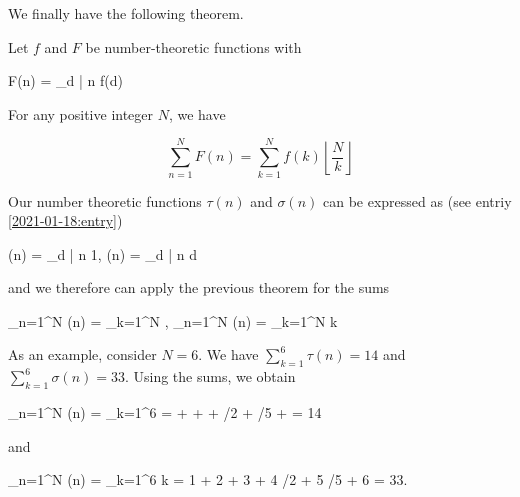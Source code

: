 We finally have the following theorem.

\begin{theorem}
    Let $f$ and $F$ be number-theoretic functions with

    \bee
        F(n) = \sum_{d | n} f(d)
    \eee

    For any positive integer $N$, we have

    \begin{equation}
        \sum_{n=1}^N F(n) = \sum_{k=1}^N f(k) \left\lfloor \frac{N}{k} \right\rfloor
    \end{equation}

\end{theorem}

Our number theoretic functions $\tau(n)$ and $\sigma(n)$ can be expressed as (see entriy \ref{2021-01-18:entry})

\bee
\tau(n) = \sum_{d | n} 1, \qquad \sigma(n) = \sum_{d | n} d
\eee

and we therefore can apply the previous theorem for the sums

\bee
\sum_{n=1}^N \tau(n) = \sum_{k=1}^N \left\lfloor {} \right\rfloor, \qquad \sum_{n=1}^N \sigma(n) = \sum_{k=1}^N k \left\lfloor {} \right\rfloor
\eee

As an example, consider $N = 6$. We have $\sum_{k=1}^6 \tau(n) = 14$ and $\sum_{k=1}^6 \sigma(n) = 33$. Using the sums, we obtain

\bee
\sum_{n=1}^N \tau(n) = \sum_{k=1}^6 \left\lfloor {} \right\rfloor =  \rfloor +  \rfloor +  \rfloor + /2 \rfloor + /5 \rfloor +  \rfloor = 14
\eee

and

\bee
\sum_{n=1}^N \sigma(n) = \sum_{k=1}^6 k \left\lfloor {} \right\rfloor = 1  \rfloor + 2  \rfloor + 3  \rfloor + 4 /2 \rfloor + 5 /5 \rfloor + 6  \rfloor = 33.
\eee



